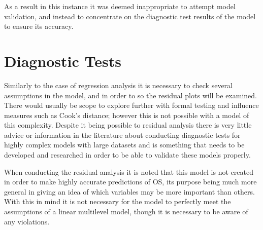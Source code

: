 \documentclass[11pt,a4paper]{report}
\begin{document}
As a result in this instance it was deemed inappropriate to attempt model validation, and instead to concentrate on the diagnostic test results of the model to ensure its accuracy. 


\newpage
\section{Diagnostic Tests} \label{MLMdiagnostics}
Similarly to the case of regression analysis it is necessary to check several assumptions in the model, and in order to so the residual plots will be examined. There would usually be scope to explore further with formal testing and influence measures such as Cook's distance; however this is not possible with a model of this complexity. Despite it being possible to residual analysis there is very little advice or information in the literature about conducting diagnostic tests for highly complex models with large datasets and is something that needs to be developed and researched in order to be able to validate these models properly. 

When conducting the residual analysis it is noted that this model is not created in order to make highly accurate predictions of OS, its purpose being much more general in giving an idea of which variables may be more important than others. With this in mind it is not necessary for the model to perfectly meet the assumptions of a linear multilevel model, though it is necessary to be aware of any violations. 
\end{document}
